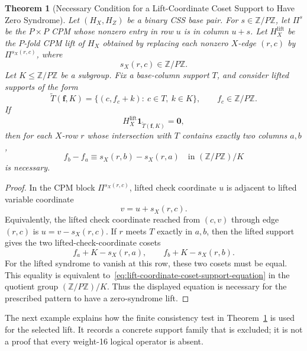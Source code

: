 \documentclass[11pt,a4paper]{article}
\newcommand{\HX}{H_X}
\newcommand{\HZ}{H_Z}
\newcommand{\HXL}{H_X^{\mathrm{lift}}}
\newcommand{\vect}[1]{\bm{#1}}
\theoremstyle{uprighttheorem}
\newtheorem{theorem}{Theorem}
\begin{document}
\begin{theorem}[Necessary Condition for a Lift-Coordinate Coset Support to Have Zero Syndrome]\label{thm:lift-coordinate-coset-support-exclusion}
Let \((\HX,\HZ)\) be a binary CSS base pair.
For \(s\in\mathbb Z/P\mathbb Z\), let \(\Pi^s\) be the \(P\times P\) CPM whose nonzero entry in row \(u\) is in column \(u+s\).
Let \(\HXL\) be the \(P\)-fold CPM lift of \(\HX\) obtained by replacing each nonzero \(X\)-edge \((r,c)\) by \(\Pi^{s_X(r,c)}\), where
\[
  s_X(r,c)\in\mathbb Z/P\mathbb Z .
\]
Let \(K\le \mathbb Z/P\mathbb Z\) be a subgroup.
Fix a base-column support \(T\), and consider lifted supports of the form
\[
  \widetilde T(\bm f,K)
  =
  \{(c,f_c+k):\ c\in T,\ k\in K\},
  \qquad
  f_c\in \mathbb Z/P\mathbb Z .
\]
If
\[
  \HXL\vect{1}_{\widetilde T(\bm f,K)}=\vect{0},
\]
then for each \(X\)-row \(r\) whose intersection with \(T\) contains exactly two columns \(a,b\),
\begin{equation}
\label{eq:lift-coordinate-coset-support-equation}
  f_b-f_a \equiv s_X(r,b)-s_X(r,a)
  \quad \text{in }(\mathbb Z/P\mathbb Z)/K
\end{equation}
is necessary.
\end{theorem}

\begin{proof}
In the CPM block \(\Pi^{s_X(r,c)}\), lifted check coordinate \(u\) is adjacent to lifted variable coordinate
\[
  v=u+s_X(r,c).
\]
Equivalently, the lifted check coordinate reached from \((c,v)\) through edge \((r,c)\) is \(u=v-s_X(r,c)\).
If \(r\) meets \(T\) exactly in \(a,b\), then the lifted support gives the two lifted-check-coordinate cosets
\[
  f_a+K-s_X(r,a),
  \qquad
  f_b+K-s_X(r,b).
\]
For the lifted syndrome to vanish at this row, these two cosets must be equal.
This equality is equivalent to~\eqref{eq:lift-coordinate-coset-support-equation} in the quotient group \((\mathbb Z/P\mathbb Z)/K\).
Thus the displayed equation is necessary for the prescribed pattern to have a zero-syndrome lift.
\end{proof}

The next example explains how the finite consistency test in Theorem~\ref{thm:lift-coordinate-coset-support-exclusion} is used for the selected lift.
It records a concrete support family that is excluded; it is not a proof that every weight-16 logical operator is absent.
\end{document}
